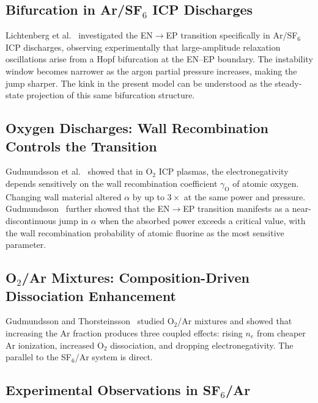 \documentclass[11pt,a4paper]{report}
\begin{document}
\subsection{Bifurcation in Ar/SF$_6$ ICP Discharges}
\label{sec:kink_bifurcation}

Lichtenberg et al.~\cite{Lichtenberg2012} investigated the EN$\to$EP transition specifically in Ar/SF$_6$ ICP discharges, observing experimentally that large-amplitude relaxation oscillations arise from a Hopf bifurcation at the EN--EP boundary.  The instability window becomes narrower as the argon partial pressure increases, making the jump sharper.  The kink in the present model can be understood as the steady-state projection of this same bifurcation structure.

\subsection{Oxygen Discharges: Wall Recombination Controls the Transition}
\label{sec:kink_oxygen}

Gudmundsson et al.~\cite{Gudmundsson2001} showed that in O$_2$ ICP plasmas, the electronegativity depends sensitively on the wall recombination coefficient $\gamma_\mathrm{O}$ of atomic oxygen.  Changing wall material altered $\alpha$ by up to $3\times$ at the same power and pressure.  Gudmundsson~\cite{Gudmundsson2002} further showed that the EN$\to$EP transition manifests as a near-discontinuous jump in $\alpha$ when the absorbed power exceeds a critical value, with the wall recombination probability of atomic fluorine as the most sensitive parameter.

\subsection{O$_2$/Ar Mixtures: Composition-Driven Dissociation Enhancement}
\label{sec:kink_O2Ar}

Gudmundsson and Thorsteinsson~\cite{Gudmundsson2007} studied O$_2$/Ar mixtures and showed that increasing the Ar fraction produces three coupled effects: rising $n_e$ from cheaper Ar ionization, increased O$_2$ dissociation, and dropping electronegativity.  The parallel to the SF$_6$/Ar system is direct.

\subsection{Experimental Observations in SF$_6$/Ar}
\label{sec:kink_expt}
\end{document}
